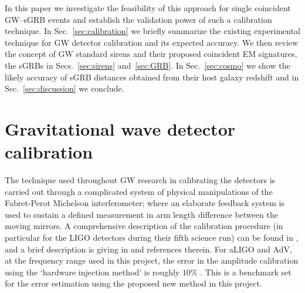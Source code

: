 \documentclass[10pt]{iopart}
\begin{document}
In this paper we investigate the feasibility of this approach for single coincident 
\ac{GW}--\ac{sGRB} events and establish the validation power of such a calibration technique.  In 
Sec.~\ref{sec:calibration} we briefly summarize the existing experimental technique for \ac{GW} 
detector calibration and its expected accuracy.  We then review the concept of \ac{GW} standard 
sirens and their proposed coincident \ac{EM} signatures, the \acp{sGRB} in
Secs.~\ref{sec:sirens} and~\ref{sec:GRB}. In Sec.~\ref{sec:cosmo} we show the likely accuracy of 
\ac{sGRB} distances obtained from their host galaxy redshift and in Sec.~\ref{sec:discussion} we 
conclude.    

\section{Gravitational wave detector calibration\label{sec:calibration}}

The technique used throughout \ac{GW} research in calibrating the detectors is carried out through 
a complicated system of physical manipulations of the Fabret-Perot Michelson interferometer; where 
an elaborate feedback system is used to sustain a defined measurement in arm length difference 
between the moving mirrors. A comprehensive description of the calibration procedure (in particular 
for the LIGO detectors during their fifth science run) can be found in \cite{2010NIMPA.624..223A}, 
and a brief description is giving in \cite{Vitale:2012} and references therein. For \ac{aLIGO} 
and \ac{AdV}, at the frequency range used in this project, the error in the amplitude calibration 
using the `hardware injection method' is roughly $10\%$ \cite{Vitale:2012}. This is a benchmark set 
for the error estimation using the proposed new method in this project.
\end{document}
